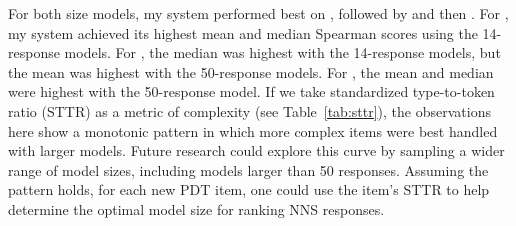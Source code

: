 For both size models, my system performed best on , followed by  and then . For , my system achieved its highest mean and median Spearman scores using the 14-response models. For , the median was highest with the 14-response models, but the mean was highest with the 50-response models. For , the mean and median were highest with the 50-response model. If we take standardized type-to-token ratio (STTR) as a metric of complexity (see Table~\ref{tab:sttr}), the observations here show a monotonic pattern in which more complex items were best handled with larger models. Future research could explore this curve by sampling a wider range of model sizes, including models larger than 50 responses. Assuming the pattern holds, for each new PDT item, one could use the item's STTR to help determine the optimal model size for ranking NNS responses.


